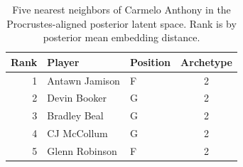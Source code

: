 \begin{table}[htbp]
  \centering\small
  \begin{tabular}{rllc}
    \toprule
    Rank & Player & Position & Archetype \\
    \midrule
    1 & Antawn Jamison & F & 2 \\
    2 & Devin Booker & G & 2 \\
    3 & Bradley Beal & G & 2 \\
    4 & CJ McCollum & G & 2 \\
    5 & Glenn Robinson & F & 2 \\
    \bottomrule
  \end{tabular}
  \caption{Five nearest neighbors of Carmelo Anthony in the Procrustes-aligned posterior latent space. Rank is by posterior mean embedding distance.}
\end{table}

